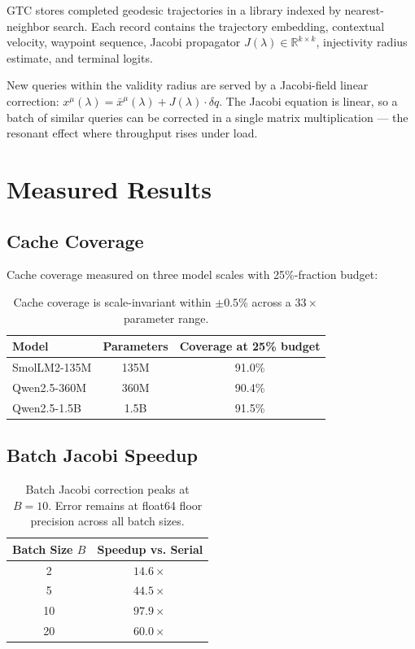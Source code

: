 \documentclass[11pt,a4paper]{article}
\begin{document}
GTC stores completed geodesic trajectories in a library indexed by
nearest-neighbor search. Each record contains the trajectory embedding,
contextual velocity, waypoint sequence, Jacobi propagator
$J(\lambda) \in \mathbb{R}^{k \times k}$, injectivity radius estimate,
and terminal logits.

New queries within the validity radius are served by a Jacobi-field
linear correction: $x^\mu(\lambda) = \bar{x}^\mu(\lambda) + J(\lambda)
\cdot \delta q$. The Jacobi equation is linear, so a batch of similar
queries can be corrected in a single matrix multiplication — the resonant
effect where throughput rises under load.

\section{Measured Results}

\subsection{Cache Coverage}

Cache coverage measured on three model scales with 25\%-fraction budget:

\begin{table}[h]\centering
\begin{tabular}{lcc}\toprule
Model & Parameters & Coverage at 25\% budget \\\midrule
SmolLM2-135M & 135M & 91.0\% \\
Qwen2.5-360M & 360M & 90.4\% \\
Qwen2.5-1.5B & 1.5B & 91.5\% \\\bottomrule
\end{tabular}
\caption{Cache coverage is scale-invariant within $\pm0.5$\% across a
$33\times$ parameter range.}
\end{table}

\subsection{Batch Jacobi Speedup}

\begin{table}[h]\centering
\begin{tabular}{cc}\toprule
Batch Size $B$ & Speedup vs. Serial \\\midrule
2 & $14.6\times$ \\
5 & $44.5\times$ \\
10 & $97.9\times$ \\
20 & $60.0\times$ \\\bottomrule
\end{tabular}
\caption{Batch Jacobi correction peaks at $B{=}10$. Error remains at
float64 floor precision across all batch sizes.}
\end{table}
\end{document}
